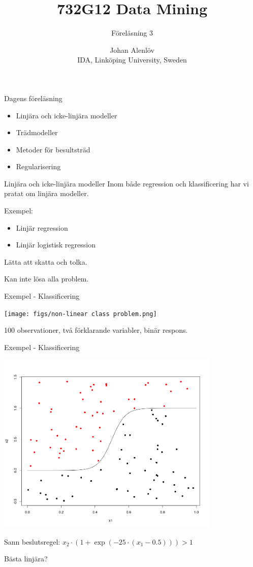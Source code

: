 \documentclass[10pt,english]{beamer}
\title{732G12 Data Mining}
\subtitle{Föreläsning 3}
\date{}
\author{Johan Alenlöv \\ IDA, Linköping University, Sweden}
\begin{document}
\maketitle

\begin{frame}{Dagens föreläsning}
    
    \begin{itemize}
        \item Linjära och icke-linjära modeller
        \item Trädmodeller
        \item Metoder för besultsträd
        \item Regularisering
    \end{itemize}

\end{frame}

\begin{frame}{Linjära och icke-linjära modeller}
    Inom både regression och klassificering har vi pratat om linjära modeller.

    Exempel:
    \begin{itemize}
        \item Linjär regression
        \item Linjär logistisk regression
    \end{itemize}

    Lätta att skatta och tolka.

    Kan inte lösa alla problem.
\end{frame}

\begin{frame}{Exempel - Klassificering}

    \texttt{[image: figs/non-linear class problem.png]}

    100 observationer, två förklarande variabler, binär respons.

\end{frame}

\begin{frame}{Exempel - Klassificering}
    
    \includegraphics[width=0.8\textwidth]{figs/non-linear class problem2.png}

    Sann beslutsregel: $x_2 \cdot (1 + \exp(-25 \cdot (x_1 - 0.5))) > 1$

    Bästa linjära?

\end{frame}
\end{document}
